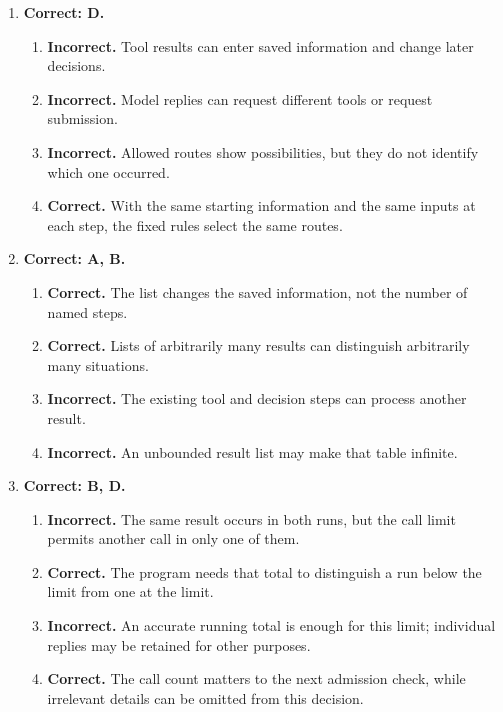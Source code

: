 \begin{enumerate}[start=1,itemsep=0.7\baselineskip]
\item[{\hyperref[exercise:3]{3.}}] \begin{minipage}[t]{\linewidth}
\textbf{Correct: D.}
\begin{enumerate}[label=\textnormal{(\Alph*)},leftmargin=*,itemsep=0pt]
\item \textbf{Incorrect.} Tool results can enter saved information and change later decisions.
\item \textbf{Incorrect.} Model replies can request different tools or request submission.
\item \textbf{Incorrect.} Allowed routes show possibilities, but they do not identify which one occurred.
\item \textbf{Correct.} With the same starting information and the same inputs at each step, the fixed rules select the same routes.
\end{enumerate}
\end{minipage}

\item[{\hyperref[exercise:4]{4.}}] \begin{minipage}[t]{\linewidth}
\textbf{Correct: A, B.}
\begin{enumerate}[label=\textnormal{(\Alph*)},leftmargin=*,itemsep=0pt]
\item \textbf{Correct.} The list changes the saved information, not the number of named steps.
\item \textbf{Correct.} Lists of arbitrarily many results can distinguish arbitrarily many situations.
\item \textbf{Incorrect.} The existing tool and decision steps can process another result.
\item \textbf{Incorrect.} An unbounded result list may make that table infinite.
\end{enumerate}
\end{minipage}

\item[{\hyperref[exercise:5]{5.}}] \begin{minipage}[t]{\linewidth}
\textbf{Correct: B, D.}
\begin{enumerate}[label=\textnormal{(\Alph*)},leftmargin=*,itemsep=0pt]
\item \textbf{Incorrect.} The same result occurs in both runs, but the call limit permits another call in only one of them.
\item \textbf{Correct.} The program needs that total to distinguish a run below the limit from one at the limit.
\item \textbf{Incorrect.} An accurate running total is enough for this limit; individual replies may be retained for other purposes.
\item \textbf{Correct.} The call count matters to the next admission check, while irrelevant details can be omitted from this decision.
\end{enumerate}
\end{minipage}


\end{enumerate}

